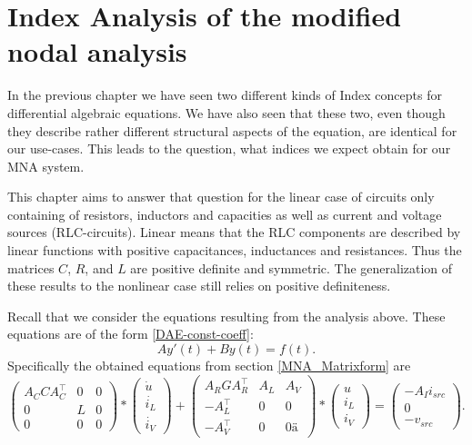 \chapter{Index Analysis of the modified nodal analysis}

\cite{ModellingAndDiscretizationOfCircuitProblems}

In the previous chapter we have seen two different kinds of Index concepts for differential algebraic equations. We have also seen that these two, even though they describe rather different structural aspects of the equation, are identical for our use-cases. This leads to the question, what indices we expect obtain for our MNA system.

This chapter aims to answer that question for the linear case of circuits only containing of resistors, inductors and capacities as well as current and voltage sources (RLC-circuits). Linear means that the RLC components are described by linear functions with positive capacitances, inductances and resistances. Thus the matrices $C$, $R$, and $L$ are positive definite and symmetric. The generalization of these results to the nonlinear case still relies on positive definiteness.

Recall that we consider the equations resulting from the analysis above. These equations are of the form \eqref{DAE-const-coeff}:
\begin{displaymath}
	A y'(t) + B y(t) = f(t).
\end{displaymath}
Specifically the obtained equations from section \ref{MNA_Matrixform} are
\begin{displaymath}
	\begin{pmatrix}
		A_C C A_C^\top & 0 & 0 \\
		0 & L & 0 \\
		0 & 0 & 0
	\end{pmatrix}
	*
	\begin{pmatrix}
		\dot{u} \\
		\dot{i_L} \\
		\dot{i_V}
	\end{pmatrix}
	+
	\begin{pmatrix}
		A_R G A_R^\top & A_L & A_V \\
		-A_L^\top & 0 & 0 \\
		-A_V^\top & 0 & 0 ä
	\end{pmatrix}
	*
	\begin{pmatrix}
		u \\
		i_L \\
		i_V
	\end{pmatrix}
	=
	\begin{pmatrix}
		-A_I i_{src} \\
		0 \\
		-v_{src}
	\end{pmatrix}.
\end{displaymath}

